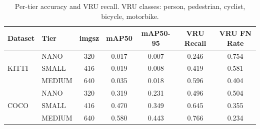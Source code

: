 \begin{table}[t]
\centering
\caption{Per-tier accuracy and VRU recall. VRU classes: person, pedestrian, cyclist, bicycle, motorbike.}
\label{tab:accuracy_per_tier}
\begin{tabular}{llccccc}
\toprule
Dataset & Tier & imgsz & mAP50 & mAP50-95 & VRU Recall & VRU FN Rate \\
\midrule
\multirow{3}{*}{KITTI} & NANO & 320 & 0.017 & 0.007 & 0.246 & 0.754 \\
 & SMALL & 416 & 0.019 & 0.008 & 0.419 & 0.581 \\
 & MEDIUM & 640 & 0.035 & 0.018 & 0.596 & 0.404 \\
\midrule
\multirow{3}{*}{COCO} & NANO & 320 & 0.319 & 0.231 & 0.496 & 0.504 \\
 & SMALL & 416 & 0.470 & 0.349 & 0.645 & 0.355 \\
 & MEDIUM & 640 & 0.580 & 0.443 & 0.766 & 0.234 \\
\bottomrule
\end{tabular}
\end{table}